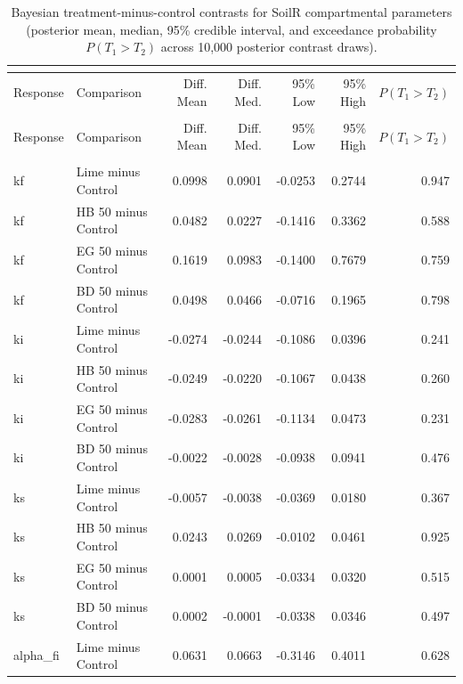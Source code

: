 \documentclass[preprint,12pt]{elsarticle}
\begin{document}
\begin{landscape}
\newpage

\begin{longtable}{@{} >{\raggedright\arraybackslash}p{3.5cm} >{\raggedright\arraybackslash}p{4.0cm} r r r r r @{} }
\caption{Bayesian treatment-minus-control contrasts for SoilR compartmental parameters (posterior mean, median, 95\% credible interval, and exceedance probability $P(T_1 > T_2)$ across 10,000 posterior contrast draws).}\\
\label{tab:soilr_tmt}\\
\toprule
Response & Comparison & Diff. Mean & Diff. Med. & 95\% Low & 95\% High & $P(T_1 > T_2)$ \\
\midrule
\endfirsthead
\multicolumn{7}{c}{{\tablename\ \thetable{} -- continued from previous page}} \\
\toprule
Response & Comparison & Diff. Mean & Diff. Med. & 95\% Low & 95\% High & $P(T_1 > T_2)$ \\
\midrule
\endhead
\midrule \multicolumn{7}{r}{{Continued on next page}} \\ \endfoot
\bottomrule \endlastfoot
kf & Lime minus Control & 0.0998 & 0.0901 & -0.0253 & 0.2744 & 0.947 \\
kf & HB 50 minus Control & 0.0482 & 0.0227 & -0.1416 & 0.3362 & 0.588 \\
kf & EG 50 minus Control & 0.1619 & 0.0983 & -0.1400 & 0.7679 & 0.759 \\
kf & BD 50 minus Control & 0.0498 & 0.0466 & -0.0716 & 0.1965 & 0.798 \\
ki & Lime minus Control & -0.0274 & -0.0244 & -0.1086 & 0.0396 & 0.241 \\
ki & HB 50 minus Control & -0.0249 & -0.0220 & -0.1067 & 0.0438 & 0.260 \\
ki & EG 50 minus Control & -0.0283 & -0.0261 & -0.1134 & 0.0473 & 0.231 \\
ki & BD 50 minus Control & -0.0022 & -0.0028 & -0.0938 & 0.0941 & 0.476 \\
ks & Lime minus Control & -0.0057 & -0.0038 & -0.0369 & 0.0180 & 0.367 \\
ks & HB 50 minus Control & 0.0243 & 0.0269 & -0.0102 & 0.0461 & 0.925 \\
ks & EG 50 minus Control & 0.0001 & 0.0005 & -0.0334 & 0.0320 & 0.515 \\
ks & BD 50 minus Control & 0.0002 & -0.0001 & -0.0338 & 0.0346 & 0.497 \\
alpha\_\allowbreak{}fi & Lime minus Control & 0.0631 & 0.0663 & -0.3146 & 0.4011 & 0.628 \\

\end{longtable}
\end{landscape}
\end{document}
